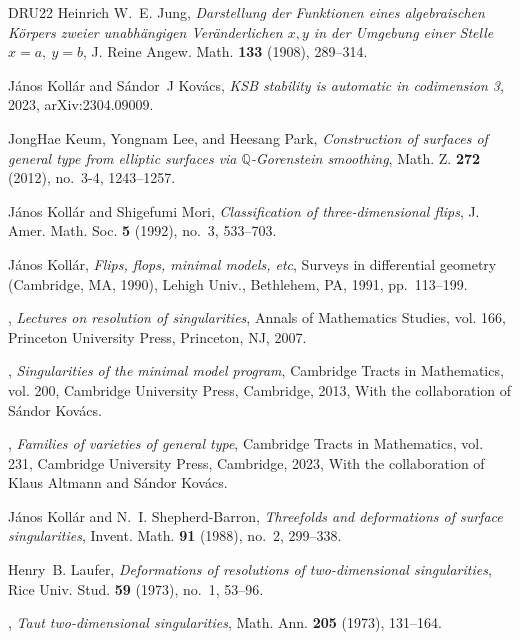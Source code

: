 \documentclass{amsart}
\theoremstyle{definition}
\theoremstyle{remark}
\begin{document}
\begin{thebibliography}{DRU22}
Heinrich W.~E. Jung, \emph{Darstellung der {F}unktionen eines algebraischen
  {K}\"orpers zweier unabh\"angigen {V}er\"anderlichen {$x,y$} in der
  {U}mgebung einer {S}telle {$x=a,\ y=b$}}, J. Reine Angew. Math. \textbf{133}
  (1908), 289--314. 

J{\'a}nos Koll{\'a}r and S{\'a}ndor~J Kov{\'a}cs, \emph{{KSB} stability is
  automatic in codimension 3}, 2023, arXiv:2304.09009.

JongHae Keum, Yongnam Lee, and Heesang Park, \emph{Construction of surfaces of
  general type from elliptic surfaces via {$\mathbb{Q}$}-{G}orenstein
  smoothing}, Math. Z. \textbf{272} (2012), no.~3-4, 1243--1257. 

J{\'a}nos Koll{\'a}r and Shigefumi Mori, \emph{Classification of
  three-dimensional flips}, J. Amer. Math. Soc. \textbf{5} (1992), no.~3,
  533--703. 

J{\'a}nos Koll{\'a}r, \emph{Flips, flops, minimal models, etc}, Surveys in
  differential geometry ({C}ambridge, {MA}, 1990), Lehigh Univ., Bethlehem, PA,
  1991, pp.~113--199. 

\bysame, \emph{Lectures on resolution of singularities}, Annals of Mathematics
  Studies, vol. 166, Princeton University Press, Princeton, NJ, 2007.

\bysame, \emph{Singularities of the minimal model program}, Cambridge Tracts in
  Mathematics, vol. 200, Cambridge University Press, Cambridge, 2013, With the
  collaboration of S{\'a}ndor Kov{\'a}cs.

\bysame, \emph{Families of varieties of general type}, Cambridge Tracts in
  Mathematics, vol. 231, Cambridge University Press, Cambridge, 2023, With the
  collaboration of Klaus Altmann and S{\'a}ndor Kov{\'a}cs. 

J{\'a}nos Koll{\'a}r and N.~I. Shepherd-Barron, \emph{Threefolds and
  deformations of surface singularities}, Invent. Math. \textbf{91} (1988),
  no.~2, 299--338.

Henry~B. Laufer, \emph{Deformations of resolutions of two-dimensional
  singularities}, Rice Univ. Stud. \textbf{59} (1973), no.~1, 53--96.

\bysame, \emph{Taut two-dimensional singularities}, Math. Ann. \textbf{205}
  (1973), 131--164. 


\end{thebibliography}
\end{document}
